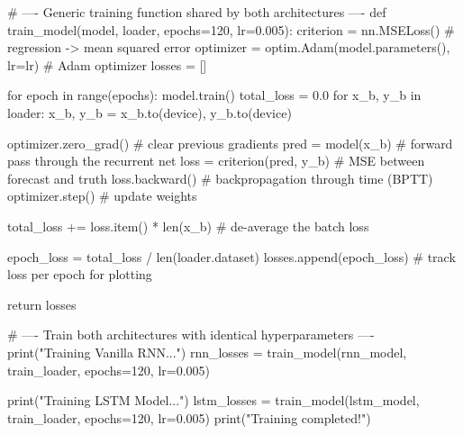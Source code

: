 \begin{codebox}[title={Generic training function shared by both architectures}]
# ---- Generic training function shared by both architectures ----
def train_model(model, loader, epochs=120, lr=0.005):
    criterion = nn.MSELoss()                          # regression -> mean squared error
    optimizer = optim.Adam(model.parameters(), lr=lr) # Adam optimizer
    losses = []

    for epoch in range(epochs):
        model.train()
        total_loss = 0.0
        for x_b, y_b in loader:
            x_b, y_b = x_b.to(device), y_b.to(device)

            optimizer.zero_grad()          # clear previous gradients
            pred = model(x_b)              # forward pass through the recurrent net
            loss = criterion(pred, y_b)    # MSE between forecast and truth
            loss.backward()                # backpropagation through time (BPTT)
            optimizer.step()               # update weights

            total_loss += loss.item() * len(x_b)   # de-average the batch loss

        epoch_loss = total_loss / len(loader.dataset)
        losses.append(epoch_loss)          # track loss per epoch for plotting

    return losses

# ---- Train both architectures with identical hyperparameters ----
print("Training Vanilla RNN...")
rnn_losses = train_model(rnn_model, train_loader, epochs=120, lr=0.005)

print("Training LSTM Model...")
lstm_losses = train_model(lstm_model, train_loader, epochs=120, lr=0.005)
print("Training completed!")
\end{codebox}

